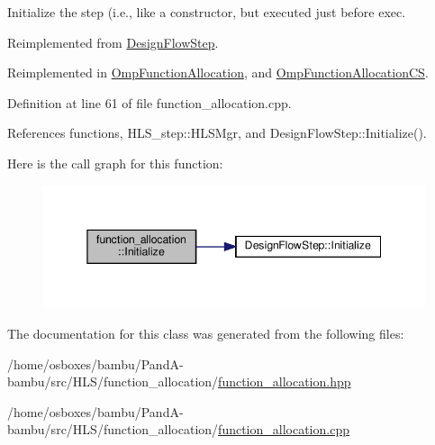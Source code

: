 Initialize the step (i.\+e., like a constructor, but executed just before exec. 



Reimplemented from \hyperlink{classDesignFlowStep_a44b50683382a094976e1d432a7784799}{Design\+Flow\+Step}.



Reimplemented in \hyperlink{classOmpFunctionAllocation_a7ed35644fe18a1430f3bcf546bef1c1a}{Omp\+Function\+Allocation}, and \hyperlink{classOmpFunctionAllocationCS_a6c97b4f87a09796aa43a387460348315}{Omp\+Function\+Allocation\+CS}.



Definition at line 61 of file function\+\_\+allocation.\+cpp.



References functions, H\+L\+S\+\_\+step\+::\+H\+L\+S\+Mgr, and Design\+Flow\+Step\+::\+Initialize().

Here is the call graph for this function\+:
\nopagebreak
\begin{figure}[H]
\begin{center}
\leavevmode
\includegraphics[width=345pt]{de/d0f/classfunction__allocation_a48d784232dd4383a11ff009a3cd78b30_cgraph}
\end{center}
\end{figure}


The documentation for this class was generated from the following files\+:\begin{DoxyCompactItemize}
\item 
/home/osboxes/bambu/\+Pand\+A-\/bambu/src/\+H\+L\+S/function\+\_\+allocation/\hyperlink{function__allocation_8hpp}{function\+\_\+allocation.\+hpp}\item 
/home/osboxes/bambu/\+Pand\+A-\/bambu/src/\+H\+L\+S/function\+\_\+allocation/\hyperlink{function__allocation_8cpp}{function\+\_\+allocation.\+cpp}\end{DoxyCompactItemize}
